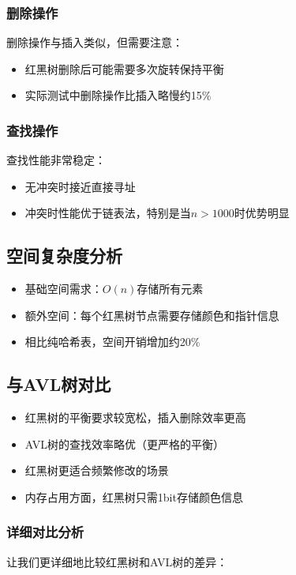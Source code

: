 \documentclass[12pt,a4paper]{article}
\begin{document}
\subsubsection{删除操作}
删除操作与插入类似，但需要注意：
\begin{itemize}
\item 红黑树删除后可能需要多次旋转保持平衡
\item 实际测试中删除操作比插入略慢约15\%
\end{itemize}

\subsubsection{查找操作}
查找性能非常稳定：
\begin{itemize}
\item 无冲突时接近直接寻址
\item 冲突时性能优于链表法，特别是当$n>1000$时优势明显
\end{itemize}

\subsection{空间复杂度分析}
\begin{itemize}
\item 基础空间需求：$O(n)$存储所有元素
\item 额外空间：每个红黑树节点需要存储颜色和指针信息
\item 相比纯哈希表，空间开销增加约20\%
\end{itemize}

\subsection{与AVL树对比}
\begin{itemize}
\item 红黑树的平衡要求较宽松，插入删除效率更高
\item AVL树的查找效率略优（更严格的平衡）
\item 红黑树更适合频繁修改的场景
\item 内存占用方面，红黑树只需1bit存储颜色信息
\end{itemize}

\subsubsection{详细对比分析}
让我们更详细地比较红黑树和AVL树的差异：
\end{document}
